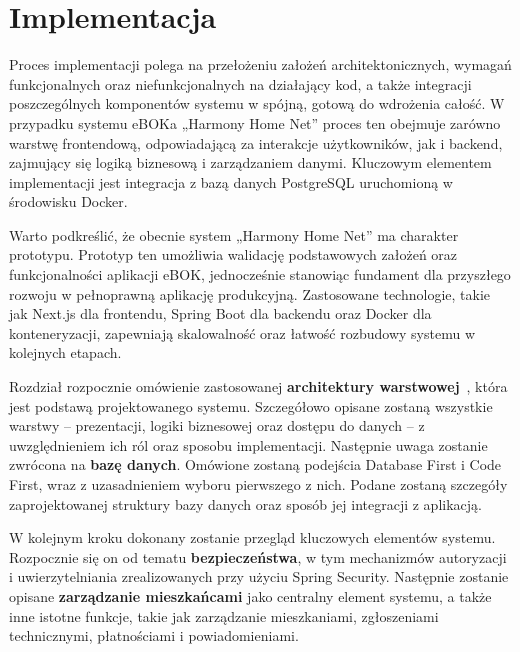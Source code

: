 \chapter{Implementacja}
Proces implementacji polega na przełożeniu założeń architektonicznych, wymagań funkcjonalnych oraz niefunkcjonalnych na działający kod, a także integracji poszczególnych komponentów systemu w spójną, gotową do wdrożenia całość. W przypadku systemu eBOKa „Harmony Home Net” proces ten obejmuje zarówno warstwę frontendową, odpowiadającą za interakcje użytkowników, jak i backend, zajmujący się logiką biznesową i zarządzaniem danymi. Kluczowym elementem implementacji jest integracja z bazą danych PostgreSQL uruchomioną w środowisku Docker.

Warto podkreślić, że obecnie system „Harmony Home Net” ma charakter prototypu. Prototyp ten umożliwia walidację podstawowych założeń oraz funkcjonalności aplikacji eBOK, jednocześnie stanowiąc fundament dla przyszłego rozwoju w pełnoprawną aplikację produkcyjną. Zastosowane technologie, takie jak Next.js dla frontendu, Spring Boot dla backendu oraz Docker dla konteneryzacji, zapewniają skalowalność oraz łatwość rozbudowy systemu w kolejnych etapach.

Rozdział rozpocznie omówienie zastosowanej \textbf{architektury warstwowej}~\cite{n_tier_wiki}, która jest podstawą projektowanego systemu. Szczegółowo opisane zostaną wszystkie warstwy – prezentacji, logiki biznesowej oraz dostępu do danych – z uwzględnieniem ich ról oraz sposobu implementacji. Następnie uwaga zostanie zwrócona na \textbf{bazę danych}. Omówione zostaną podejścia Database First i Code First, wraz z uzasadnieniem wyboru pierwszego z nich. Podane zostaną szczegóły zaprojektowanej struktury bazy danych oraz sposób jej integracji z aplikacją.

W kolejnym kroku dokonany zostanie przegląd kluczowych elementów systemu. Rozpocznie się on od tematu \textbf{bezpieczeństwa}, w tym mechanizmów autoryzacji i uwierzytelniania zrealizowanych przy użyciu Spring Security. Następnie zostanie opisane \textbf{zarządzanie mieszkańcami} jako centralny element systemu, a także inne istotne funkcje, takie jak zarządzanie mieszkaniami, zgłoszeniami technicznymi, płatnościami i powiadomieniami.




